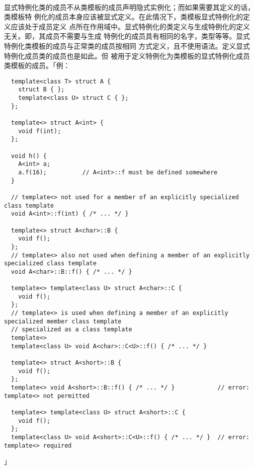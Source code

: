 \paragraph{}
显式特例化类的成员不从类模板的成员声明隐式实例化；而如果需要其定义的话，类模板特
例化的成员本身应该被显式定义。在此情况下，类模板显式特例化的定义应该处于成员定义
点所在作用域中。显式特例化的类定义与生成特例化的定义无关。即，其成员不需要与生成
特例化的成员具有相同的名字，类型等等。显式特例化类模板的成员与正常类的成员按相同
方式定义，且不使用语法。定义显式特例化成员类的成员也是如此。但
被用于定义特例化为类模板的显式特例化成员类模板的成员。「例：
\begin{lstlisting}
  template<class T> struct A {
    struct B { };
    template<class U> struct C { };
  };

  template<> struct A<int> {
    void f(int);
  };

  void h() {
    A<int> a;
    a.f(16);          // A<int>::f must be defined somewhere
  }

  // template<> not used for a member of an explicitly specialized class template
  void A<int>::f(int) { /* ... */ }

  template<> struct A<char>::B {
    void f();
  };
  // template<> also not used when defining a member of an explicitly specialized class template
  void A<char>::B::f() { /* ... */ }

  template<> template<class U> struct A<char>::C {
    void f();
  };
  // template<> is used when defining a member of an explicitly specialized member class template
  // specialized as a class template
  template<>
  template<class U> void A<char>::C<U>::f() { /* ... */ }

  template<> struct A<short>::B {
    void f();
  };
  template<> void A<short>::B::f() { /* ... */ }            // error: template<> not permitted

  template<> template<class U> struct A<short>::C {
    void f();
  };
  template<class U> void A<short>::C<U>::f() { /* ... */ }  // error: template<> required
\end{lstlisting}」

